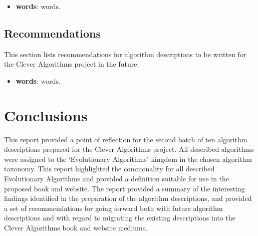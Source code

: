 \documentclass[a4paper, 11pt]{article}
\begin{document}
\begin{itemize}
	\item \textbf{words}: words.
\end{itemize}


% 
% 
\subsection{Recommendations}
This section lists recommendations for algorithm descriptions to be written for the Clever Algorithms project in the future. 

\begin{itemize}
	\item \textbf{words}: words.
\end{itemize}

% 
% 
\section{Conclusions}
\label{sec:conclusions}
This report provided a point of reflection for the second batch of ten algorithm descriptions prepared for the Clever Algorithms project. All described algorithms were assigned to the `Evolutionary Algorithms' kingdom in the chosen algorithm taxonomy. This report highlighted the commonality for all described Evolutionary Algorithms and provided a definition suitable for use in the proposed book and website.
The report provided a summary of the interesting findings identified in the preparation of the algorithm descriptions, and provided a set of recommendations for going forward both with future algorithm descriptions and with regard to migrating the existing descriptions into the Clever Algorithms book and website mediums.



\end{document}
